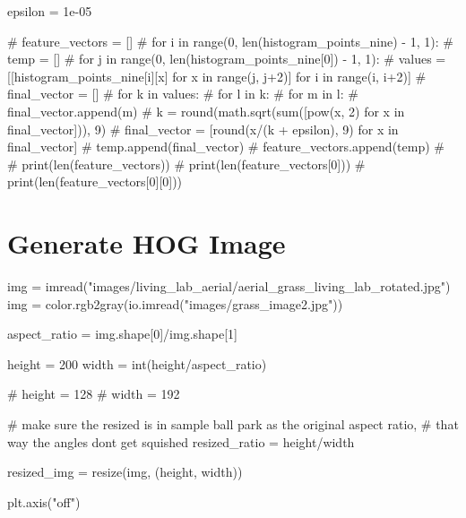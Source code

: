 \documentclass[
  letterpaper,
]{report}
\newenvironment{Shaded}{\begin{snugshade}}{\end{snugshade}}
\newcommand{\BuiltInTok}[1]{\textcolor[rgb]{0.00,0.23,0.31}{#1}}
\newcommand{\CommentTok}[1]{\textcolor[rgb]{0.37,0.37,0.37}{#1}}
\newcommand{\DecValTok}[1]{\textcolor[rgb]{0.68,0.00,0.00}{#1}}
\newcommand{\FloatTok}[1]{\textcolor[rgb]{0.68,0.00,0.00}{#1}}
\newcommand{\NormalTok}[1]{\textcolor[rgb]{0.00,0.23,0.31}{#1}}
\newcommand{\OperatorTok}[1]{\textcolor[rgb]{0.37,0.37,0.37}{#1}}
\newcommand{\StringTok}[1]{\textcolor[rgb]{0.13,0.47,0.30}{#1}}
\begin{document}
\begin{Shaded}
\begin{Highlighting}[]
\NormalTok{epsilon }\OperatorTok{=} \FloatTok{1e{-}05}

\CommentTok{\# feature\_vectors = []}
\CommentTok{\# for i in range(0, len(histogram\_points\_nine) {-} 1, 1):}
\CommentTok{\#   temp = []}
\CommentTok{\#   for j in range(0, len(histogram\_points\_nine[0]) {-} 1, 1):}
\CommentTok{\#     values = [[histogram\_points\_nine[i][x] for x in range(j, j+2)] for i in range(i, i+2)]}
\CommentTok{\#     final\_vector = []}
\CommentTok{\#     for k in values:}
\CommentTok{\#       for l in k:}
\CommentTok{\#         for m in l:}
\CommentTok{\#           final\_vector.append(m)}
\CommentTok{\#     k = round(math.sqrt(sum([pow(x, 2) for x in final\_vector])), 9)}
\CommentTok{\#     final\_vector = [round(x/(k + epsilon), 9) for x in final\_vector]}
\CommentTok{\#     temp.append(final\_vector)}
\CommentTok{\#   feature\_vectors.append(temp)}
\CommentTok{\#   }
\CommentTok{\# print(len(feature\_vectors))}
\CommentTok{\# print(len(feature\_vectors[0]))}
\CommentTok{\# print(len(feature\_vectors[0][0]))}
\end{Highlighting}
\end{Shaded}

\hypertarget{generate-hog-image}{%
\section{Generate HOG Image}\label{generate-hog-image}}

\begin{Shaded}
\begin{Highlighting}[]
\NormalTok{img }\OperatorTok{=}\NormalTok{ imread(}\StringTok{"images/living\_lab\_aerial/aerial\_grass\_living\_lab\_rotated.jpg"}\NormalTok{)}
\NormalTok{img }\OperatorTok{=}\NormalTok{ color.rgb2gray(io.imread(}\StringTok{"images/grass\_image2.jpg"}\NormalTok{))}

\NormalTok{aspect\_ratio }\OperatorTok{=}\NormalTok{ img.shape[}\DecValTok{0}\NormalTok{]}\OperatorTok{/}\NormalTok{img.shape[}\DecValTok{1}\NormalTok{]}

\NormalTok{height }\OperatorTok{=} \DecValTok{200}
\NormalTok{width }\OperatorTok{=} \BuiltInTok{int}\NormalTok{(height}\OperatorTok{/}\NormalTok{aspect\_ratio)}

\CommentTok{\# height = 128}
\CommentTok{\# width = 192}

\CommentTok{\# make sure the resized is in sample ball park as the original aspect ratio, }
\CommentTok{\# that way the angles don\textquotesingle{}t get squished}
\NormalTok{resized\_ratio }\OperatorTok{=}\NormalTok{ height}\OperatorTok{/}\NormalTok{width}


\NormalTok{resized\_img }\OperatorTok{=}\NormalTok{ resize(img, (height, width))}

\NormalTok{plt.axis(}\StringTok{"off"}\NormalTok{)}
\end{Highlighting}
\end{Shaded}
\end{document}
